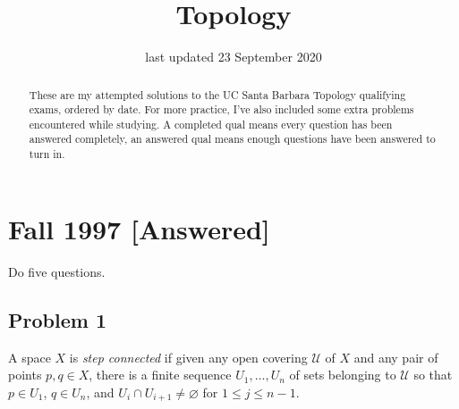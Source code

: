\documentclass[12pt]{article}
\newcommand{\ita}[1]{\textit{#1}}
\theoremstyle{definition}
\begin{document}
\date{last updated 23 September 2020} 
\author{}
\title{Topology}
\maketitle
\tableofcontents
\newpage
\begin{abstract}
    These are my attempted solutions to the UC Santa Barbara Topology qualifying exams, ordered by date. For more practice, I've also included some extra problems encountered while studying. A completed qual means every question has been answered completely, an answered qual means enough questions have been answered to turn in.
\end{abstract}
\section{Fall 1997 [Answered]}
Do five questions.
\subsection{Problem 1 \texorpdfstring{\cite{step}}{}}
A space $X$ is \ita{step connected} if given any open covering $\mathcal{U}$ of $X$ and any pair of points $p , q \in X$, there is a finite sequence $U_1 , \dotsc , U_n$ of sets belonging to $\mathcal{U}$ so that $p \in U_1$, $q \in U_n$, and $U_i \cap U_{i+1} \neq \varnothing$ for $1 \leq j \leq n-1$.
\end{document}
